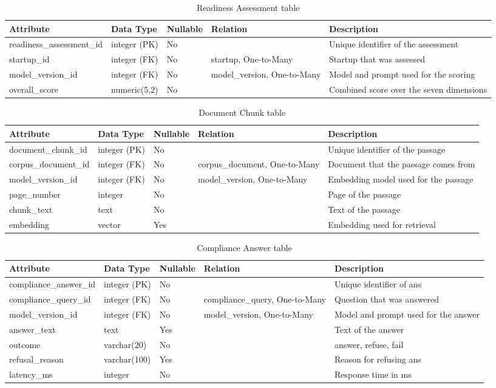 \documentclass{FastFyp}
\newcommand{\ddhead}{\hline \textbf{Attribute} & \textbf{Data Type} & \textbf{Nullable} & \textbf{Relation} & \textbf{Description} \\ \hline}
\begin{document}
\begin{table}[!ht]
\centering
\caption{Readiness Assessment table}
\label{tab:dd-readiness-assessment}
\begin{tabular}{|p{3.2cm}|p{2.5cm}|p{1.4cm}|p{2.9cm}|p{4.0cm}|}
\ddhead
readiness\_assessment\_id & integer (PK) & No &  & Unique identifier of the assessment \\ \hline
startup\_id & integer (FK) & No & startup, One-to-Many & Startup that was assessed \\ \hline
model\_version\_id & integer (FK) & No & model\_version, One-to-Many & Model and prompt used for the scoring \\ \hline
overall\_score & numeric(5,2) & No &  & Combined score over the seven dimensions \\ \hline
\end{tabular}
\end{table}

\begin{table}[!ht]
\centering
\caption{Document Chunk table}
\label{tab:dd-document-chunk}
\begin{tabular}{|p{3.2cm}|p{2.5cm}|p{1.4cm}|p{2.9cm}|p{4.0cm}|}
\ddhead
document\_chunk\_id & integer (PK) & No &  & Unique identifier of the passage \\ \hline
corpus\_document\_id & integer (FK) & No & corpus\_document, One-to-Many & Document that the passage comes from \\ \hline
model\_version\_id & integer (FK) & No & model\_version, One-to-Many & Embedding model used for the passage \\ \hline
page\_number & integer & No &  & Page of the passage \\ \hline
chunk\_text & text & No &  & Text of the passage \\ \hline
embedding & vector & Yes &  & Embedding used for retrieval \\ \hline
\end{tabular}
\end{table}

\begin{table}[!ht]
\centering
\caption{Compliance Answer table}
\label{tab:dd-compliance-answer}
\begin{tabular}{|p{3.2cm}|p{2.5cm}|p{1.4cm}|p{2.9cm}|p{4.0cm}|}
\ddhead
compliance\_answer\_id & integer (PK) & No &  & Unique identifier of ans \\ \hline
compliance\_query\_id & integer (FK) & No & compliance\_query, One-to-Many & Question that was answered \\ \hline
model\_version\_id & integer (FK) & No & model\_version, One-to-Many & Model and prompt used for the answer \\ \hline
answer\_text & text & Yes &  & Text of the answer \\ \hline
outcome & varchar(20) & No &  & answer, refuse, fail \\ \hline
refusal\_reason & varchar(100) & Yes &  & Reason for refusing ans \\ \hline
latency\_ms & integer & No &  & Response time in ms \\ \hline
\end{tabular}
\end{table}
\end{document}
